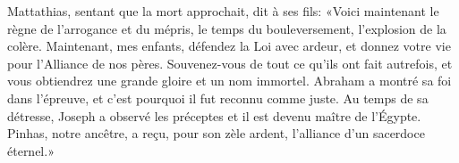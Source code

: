Mattathias, sentant que la mort approchait, dit à ses fils:
	«Voici maintenant le règne de l’arrogance et du mépris,
	le temps du bouleversement, l’explosion de la colère.
Maintenant, mes enfants, défendez la Loi avec ardeur,
	et donnez votre vie pour l’Alliance de nos pères.
Souvenez-vous de tout ce qu’ils ont fait autrefois,
	et vous obtiendrez une grande gloire et un nom immortel.
Abraham a montré sa foi dans l’épreuve,
	et c’est pourquoi il fut reconnu comme juste.
Au temps de sa détresse, Joseph a observé les préceptes
	et il est devenu maître de l’Égypte.
Pinhas, notre ancêtre, a reçu, pour son zèle ardent, l’alliance d’un sacerdoce éternel.»
